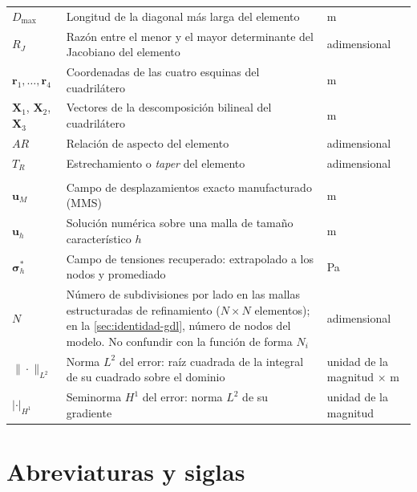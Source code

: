 \begin{longtable}{@{}>{\raggedright\arraybackslash}p{3.0cm}p{7.8cm}p{3.0cm}@{}}
$D_{\max}$ & Longitud de la diagonal más larga del elemento & m \\
$R_J$ & Razón entre el menor y el mayor determinante del Jacobiano del elemento & adimensional \\
$\bm{r}_1,\dots,\bm{r}_4$ & Coordenadas de las cuatro esquinas del cuadrilátero & m \\
$\bm{X}_1$, $\bm{X}_2$, $\bm{X}_3$ & Vectores de la descomposición bilineal del cuadrilátero & m \\
$AR$ & Relación de aspecto del elemento & adimensional \\
$T_R$ & Estrechamiento o \emph{taper} del elemento & adimensional \\
\addlinespace
\multicolumn{3}{@{}l}{\textit{Verificación y validación}} \\
\addlinespace
$\bm{u}_M$ & Campo de desplazamientos exacto manufacturado (MMS) & m \\
$\bm{u}_h$ & Solución numérica sobre una malla de tamaño característico $h$ & m \\
$\bm{\sigma}^*_h$ & Campo de tensiones recuperado: extrapolado a los nodos y promediado & Pa \\
$N$ & Número de subdivisiones por lado en las mallas estructuradas de refinamiento ($N\times N$ elementos); en la \autoref{sec:identidad-gdl}, número de nodos del modelo. No confundir con la función de forma $N_i$ & adimensional \\
$\|\cdot\|_{L^2}$ & Norma $L^2$ del error: raíz cuadrada de la integral de su cuadrado sobre el dominio & unidad de la magnitud $\times$ m \\
$|\cdot|_{H^1}$ & Seminorma $H^1$ del error: norma $L^2$ de su gradiente & unidad de la magnitud \\
\end{longtable}

\section*{Abreviaturas y siglas}

